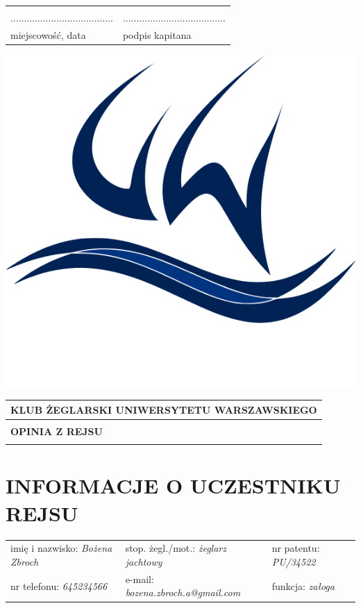 \documentclass{article}
\begin{document}
\begin{tabularx}{\textwidth}{X X}
\\\\
...................................... & ......................................\\
miejscowość, data & podpis kapitana\\
\end{tabularx}
\newpage
\begin{minipage}{0.11\textwidth}
\includegraphics[width=\textwidth]{logo.png}
\end{minipage}
\begin{minipage}{0.89\textwidth}
\begin{tabularx}{\textwidth} { 
  | >{\centering\arraybackslash}X | }
 \hline
 \textbf{KLUB ŻEGLARSKI UNIWERSYTETU WARSZAWSKIEGO} \\
 \hline
 \\
 \textbf{\huge OPINIA Z REJSU} \\
 \\
\hline
\end{tabularx}
\end{minipage}

\section*{INFORMACJE O UCZESTNIKU REJSU}
\begin{tabularx}{\textwidth}{X X X}
imię i nazwisko: \textit{Bożena Zbroch} & stop. żegl./mot.: \textit{żeglarz jachtowy} & nr patentu: \textit{PU/34522} \\
nr telefonu: \textit{645234566} & e-mail: \textit{bozena.zbroch.a@gmail.com} & funkcja: \textit{załoga} \\
\end{tabularx}
\end{document}
